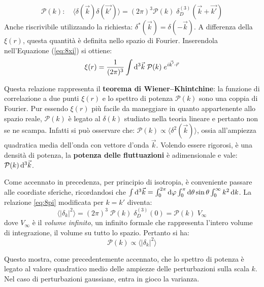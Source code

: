 \begin{example}

    \begin{equation}
        \mathcal{P}(k): \quad \langle \delta (\vec{k}) \delta(\vec{k'})\rangle = (2\pi)^3 \mathcal{P}(k)\; \delta_D^{(3)}(\vec{k}+\vec{k'})\label{eq:8pi}
    \end{equation}
    Anche riscrivibile utilizzando la richiesta: $\delta^*(\vec{k})=\delta{(-\vec{k})}$. A differenza della $\xi(r)$, questa quantità è definita nello spazio di Fourier. Inserendola nell'Equazione (\ref{eq:8xi}) si ottiene:
    \begin{equation}
        \xi (r) = \frac{1}{(2\pi)^3} \int \operatorname{d}\!{^3\vec{k}}\; \mathcal{P}(k)\; e^{i\vec{k'}\cdot \vec{r}}
    \end{equation}

    Questa relazione rappresenta il \textbf{teorema di Wiener–Khintchine}: la funzione di correlazione a due punti $\xi (r)$  e lo spettro di potenza $\mathcal{P}(k)$ sono una coppia di Fourier. Pur essendo $\xi (r)$ più facile da maneggiare in quanto appartenente allo spazio reale, $\mathcal{P}(k)$ è legato al $\delta (k)$ studiato nella teoria lineare e pertanto non se ne scampa. Infatti si può osservare che: $\mathcal{P}(k)\propto \langle\delta^2 (\vec{k})  \rangle $, ossia all'ampiezza quadratica media dell'onda con vettore d'onda $\vec{k}$. Volendo essere rigorosi, è una densità di potenza, la \textbf{potenza delle fluttuazioni} è adimensionale e vale: $\mathcal{P}(k)\operatorname{d}\!{^3 \vec{k}}$.
\end{example}

Come accennato in precedenza, per principio di isotropia, è conveniente passare alle coordiate sferiche, ricordandosi che $\int \operatorname{d}\!{^3 \vec{k}}=\int_0^{2\pi}\operatorname{d}\!{\varphi}\int_0^\pi\operatorname{d}\!{\theta}\sin\theta\int_0^\infty k^2\operatorname{d}\!{k}$. La relazione \ref{eq:8pi} modificata per $k=k'$ diventa:
\begin{equation*}
    \langle | \delta_k |^2 \rangle = (2\pi)^3 \; \mathcal{P}(k) \; \delta_D^{(3)}(0) = \mathcal{P}(k) \; V_\infty 
\end{equation*}
dove $V_\infty$ è il \textit{volume infinito}, un infinito formale che rappresenta l'intero volume di integrazione, il volume su tutto lo spazio. Pertanto si ha:
$$
\mathcal{P}(k)  \propto \langle | \delta_k|^2 \rangle
$$

Questo mostra, come precedentemente accennato, che lo spettro di potenza è legato al valore quadratico medio delle ampiezze delle perturbazioni sulla scala $k$. Nel caso di perturbazioni gaussiane, entra in gioco la varianza. 

